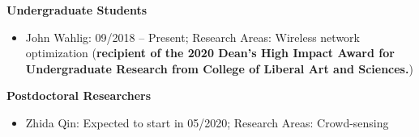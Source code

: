 \documentclass[overlapped,line,letterpaper]{res1}
\begin{document}
\begin{resume}
\hspace{-.55in} {\bf Undergraduate Students}
\vspace{.16in}
\begin{itemize}
\item John Wahlig: 09/2018 -- Present; Research Areas: Wireless network optimization ({\bf recipient of the 2020 Dean's High Impact Award for Undergraduate Research from College of Liberal Art and Sciences.})
\end{itemize}

\hspace{-.55in} {\bf Postdoctoral Researchers}
\vspace{.16in}
\begin{itemize}

\item Zhida Qin: Expected to start in 05/2020; Research Areas: Crowd-sensing
\end{itemize}







\end{resume}
\end{document}
